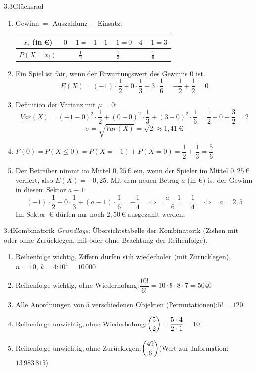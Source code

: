 
\begin{loesung}{3.3}{Glücksrad}
\begin{enumerate}[label=\alph*)]
  \item Gewinn $=$ Auszahlung $-$ Einsatz:
  \begin{center}\begin{tabular}{|c|c|c|c|}
    \hline
    $x_i$ (in €) & $0-1 = -1$ & $1-1 = 0$ & $4-1 = 3$\\
    \hline
    $P(X=x_i)$ & $\frac{1}{2}$ & $\frac{1}{3}$ & $\frac{1}{6}$\\
    \hline
  \end{tabular}\end{center}
  \item Ein Spiel ist fair, wenn der Erwartungswert des Gewinns $0$ ist.
  \[E(X) = (-1)\cdot\dfrac{1}{2}+0\cdot\dfrac{1}{3}+3\cdot\dfrac{1}{6} = -\dfrac{1}{2}+\dfrac{1}{2} = 0\]
  \item Definition der Varianz mit $\mu=0$:
  \[Var(X) = (-1-0)^2\cdot\dfrac{1}{2}+(0-0)^2\cdot\dfrac{1}{3}+(3-0)^2\cdot\dfrac{1}{6} = \dfrac{1}{2}+0+\dfrac{3}{2} = 2\]
  \[\sigma = \sqrt{Var(X)} = \sqrt{2}\approx 1{,}41\ \text{€}\]
  \item $F(0) = P(X\leq 0) = P(X=-1)+P(X=0) = \dfrac{1}{2}+\dfrac{1}{3} = \dfrac{5}{6}$
  \item Der Betreiber nimmt im Mittel $0{,}25$\,€ ein, wenn der Spieler im Mittel $0{,}25$\,€ verliert, also $E(X) = -0{,}25$. Mit dem neuen Betrag $a$ (in €) ist der Gewinn in diesem Sektor $a-1$:
  \[(-1)\cdot\dfrac{1}{2}+0\cdot\dfrac{1}{3}+(a-1)\cdot\dfrac{1}{6} = -\dfrac{1}{4}\quad\Longleftrightarrow\quad\dfrac{a-1}{6} = \dfrac{1}{4}\quad\Longleftrightarrow\quad a = 2{,}5\]
  Im Sektor \,€\grqq{} dürfen nur noch $2{,}50$\,€ ausgezahlt werden.
\end{enumerate}
\end{loesung}
\newpage
{}

\begin{loesung}{3.4}{Kombinatorik}
\textit{Grundlage:} Übersichtstabelle der Kombinatorik (Ziehen mit oder ohne Zurücklegen, mit oder ohne Beachtung der Reihenfolge).
\begin{enumerate}[label=\alph*)]
  \item Reihenfolge wichtig, Ziffern dürfen sich wiederholen (\glqq mit Zurücklegen\grqq), $n=10$, $k=4$:\quad $10^4 = 10\,000$
  \item Reihenfolge wichtig, ohne Wiederholung:\quad $\dfrac{10!}{6!} = 10\cdot 9\cdot 8\cdot 7 = 5040$
  \item Alle Anordnungen von $5$ verschiedenen Objekten (Permutationen):\quad $5! = 120$
  \item Reihenfolge unwichtig, ohne Wiederholung:\quad $\dbinom{5}{2} = \dfrac{5\cdot 4}{2\cdot 1} = 10$
  \item Reihenfolge unwichtig, ohne Zurücklegen:\quad $\dbinom{49}{6}$\quad (Wert zur Information: $13\,983\,816$)
\end{enumerate}
\end{loesung}

